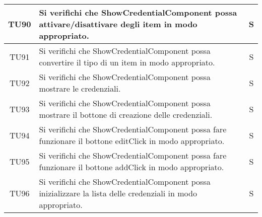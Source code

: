 \begin{center}
\begin{longtable}{|c|p{10cm}|c|}
			TU90 & Si verifichi che ShowCredentialComponent possa attivare/disattivare degli item in modo appropriato. & S \\
			\hline
			TU91 & Si verifichi che ShowCredentialComponent possa convertire il tipo di un item in modo appropriato. & S \\
			\hline
			TU92 & Si verifichi che ShowCredentialComponent possa mostrare le credenziali. & S \\
			\hline
			TU93 & Si verifichi che ShowCredentialComponent possa mostrare il bottone di creazione delle credenziali. & S \\
			\hline
			TU94 & Si verifichi che ShowCredentialComponent possa fare funzionare il bottone editClick in modo appropriato. & S \\
			\hline	  
			TU95 & Si verifichi che ShowCredentialComponent possa fare funzionare il bottone addClick in modo appropriato. & S \\
			\hline
			TU96 & Si verifichi che ShowCredentialComponent possa inizializzare la lista delle credenziali in modo appropriato. & S \\
			\hline
			

\end{longtable}
\end{center}
